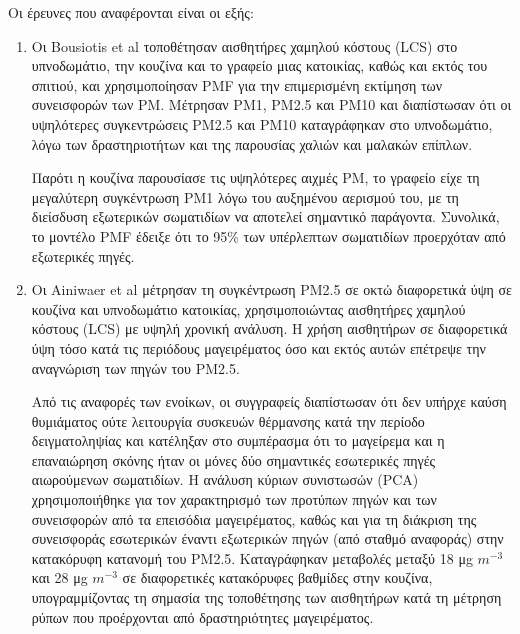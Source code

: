 Οι έρευνες που αναφέρονται είναι οι εξής:

\begin{enumerate}

    \item Οι Bousiotis et al \cite{BOUSIOTIS2023107907} τοποθέτησαν αισθητήρες χαμηλού κόστους (LCS) στο υπνοδωμάτιο, την κουζίνα και το γραφείο μιας κατοικίας, καθώς και εκτός του σπιτιού, και χρησιμοποίησαν PMF για την επιμερισμένη εκτίμηση των συνεισφορών των PM.
     Μέτρησαν PM1, PM2.5 και PM10 και διαπίστωσαν ότι οι υψηλότερες συγκεντρώσεις PM2.5 και PM10 καταγράφηκαν στο υπνοδωμάτιο, λόγω των δραστηριοτήτων και της παρουσίας χαλιών και μαλακών επίπλων. 
     
     Παρότι η κουζίνα παρουσίασε τις υψηλότερες αιχμές PM, το γραφείο είχε τη μεγαλύτερη συγκέντρωση PM1 λόγω του αυξημένου αερισμού του, με τη διείσδυση εξωτερικών σωματιδίων να αποτελεί σημαντικό παράγοντα. 
     Συνολικά, το μοντέλο PMF έδειξε ότι το 95\% των υπέρλεπτων σωματιδίων προερχόταν από εξωτερικές πηγές.
    
    \item Οι Ainiwaer et al \cite{AINIWAER2022119652} μέτρησαν τη συγκέντρωση PM2.5 σε οκτώ διαφορετικά ύψη σε κουζίνα και υπνοδωμάτιο κατοικίας, χρησιμοποιώντας αισθητήρες χαμηλού κόστους (LCS) με υψηλή χρονική ανάλυση.
     Η χρήση αισθητήρων σε διαφορετικά ύψη τόσο κατά τις περιόδους μαγειρέματος όσο και εκτός αυτών επέτρεψε την αναγνώριση των πηγών του PM2.5.
      
     Από τις αναφορές των ενοίκων, οι συγγραφείς διαπίστωσαν ότι δεν υπήρχε καύση θυμιάματος ούτε λειτουργία συσκευών θέρμανσης κατά την περίοδο δειγματοληψίας και κατέληξαν στο συμπέρασμα ότι το μαγείρεμα και η επαναιώρηση σκόνης 
      ήταν οι μόνες δύο σημαντικές εσωτερικές πηγές αιωρούμενων σωματιδίων. Η ανάλυση κύριων συνιστωσών (PCA) χρησιμοποιήθηκε για τον χαρακτηρισμό των προτύπων πηγών και των συνεισφορών από τα επεισόδια μαγειρέματος, 
      καθώς και για τη διάκριση της συνεισφοράς εσωτερικών έναντι εξωτερικών πηγών (από σταθμό αναφοράς) στην κατακόρυφη κατανομή του PM2.5. Καταγράφηκαν μεταβολές μεταξύ 18 μg $m^{-3} $και 28 μg $m^{-3}$ σε διαφορετικές κατακόρυφες βαθμίδες στην κουζίνα,
       υπογραμμίζοντας τη σημασία της τοποθέτησης των αισθητήρων κατά τη μέτρηση ρύπων που προέρχονται από δραστηριότητες μαγειρέματος.
    

\end{enumerate}
